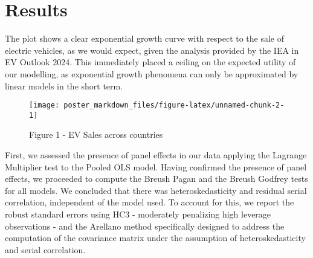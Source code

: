 \documentclass[
]{article}
\begin{document}
\section{\texorpdfstring{\textbf{Results}}{Results}}\label{results}

The plot shows a clear exponential growth curve with respect to the sale
of electric vehicles, as we would expect, given the analysis provided by
the IEA in EV Outlook 2024. This immediately placed a ceiling on the
expected utility of our modelling, as exponential growth phenomena can
only be approximated by linear models in the short term.

\begin{figure}

{\centering \texttt{[image: poster\_markdown\_files/figure-latex/unnamed-chunk-2-1]} 

}

\caption{Figure 1 - EV Sales across countries}\label{fig:unnamed-chunk-2}
\end{figure}

First, we assessed the presence of panel effects in our data applying
the Lagrange Multiplier test to the Pooled OLS model. Having confirmed
the presence of panel effects, we proceeded to compute the Breush Pagan
and the Breush Godfrey tests for all models. We concluded that there was
heteroskedasticity and residual serial correlation, independent of the
model used. To account for this, we report the robust standard errors
using HC3 - moderately penalizing high leverage observations - and the
Arellano method specifically designed to address the computation of the
covariance matrix under the assumption of heteroskedasticity and serial
correlation.
\end{document}
